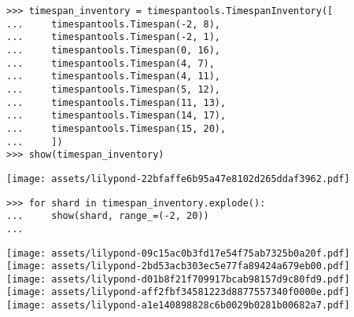 \begin{comment}
<abjad>
timespan_inventory = timespantools.TimespanInventory([
    timespantools.Timespan(-2, 8),
    timespantools.Timespan(-2, 1),
    timespantools.Timespan(0, 16),
    timespantools.Timespan(4, 7),
    timespantools.Timespan(4, 11),
    timespantools.Timespan(5, 12),
    timespantools.Timespan(11, 13),
    timespantools.Timespan(14, 17),
    timespantools.Timespan(15, 20),
    ])
show(timespan_inventory)
for shard in timespan_inventory.explode():
    show(shard, range_=(-2, 20))

</abjad>
\end{comment}

\begin{abjadbookoutput}
\begin{singlespacing}
\vspace{-0.5\baselineskip}
\begin{lstlisting}
>>> timespan_inventory = timespantools.TimespanInventory([
...     timespantools.Timespan(-2, 8),
...     timespantools.Timespan(-2, 1),
...     timespantools.Timespan(0, 16),
...     timespantools.Timespan(4, 7),
...     timespantools.Timespan(4, 11),
...     timespantools.Timespan(5, 12),
...     timespantools.Timespan(11, 13),
...     timespantools.Timespan(14, 17),
...     timespantools.Timespan(15, 20),
...     ])
>>> show(timespan_inventory)
\end{lstlisting}
\noindent\texttt{[image: assets/lilypond-22bfaffe6b95a47e8102d265ddaf3962.pdf]}
\begin{lstlisting}
>>> for shard in timespan_inventory.explode():
...     show(shard, range_=(-2, 20))
...
\end{lstlisting}
\noindent\texttt{[image: assets/lilypond-09c15ac0b3fd17e54f75ab7325b0a20f.pdf]}\\
\noindent\texttt{[image: assets/lilypond-2bd53acb303ec5e77fa89424a679eb00.pdf]}\\
\noindent\texttt{[image: assets/lilypond-d01b8f21f709917bcab98157d9c80fd9.pdf]}\\
\noindent\texttt{[image: assets/lilypond-aff2fbf34581223d8877557340f0000e.pdf]}\\
\noindent\texttt{[image: assets/lilypond-a1e140898828c6b0029b0281b00682a7.pdf]}
\end{singlespacing}
\end{abjadbookoutput}

